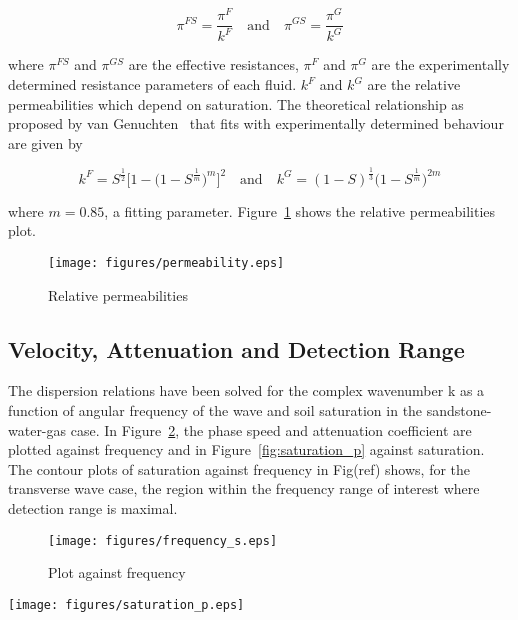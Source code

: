 \documentclass[twocolumn]{article}
\begin{document}
\begin{equation}
    \pi^{FS}= \frac{\pi^F}{k^F}\quad \text{and} \quad \pi^{GS}=\frac{\pi^G}{k^G}
\end{equation}

where $\pi^{FS}$ and $\pi^{GS}$ are the effective resistances, $\pi^F$ and $\pi^G$ are the experimentally determined resistance parameters of each fluid. $k^F$ and $k^G$ are the relative permeabilities which depend on saturation. The theoretical relationship as proposed by van Genuchten~\cite{van_genuchten_1980} that fits with experimentally determined behaviour~\cite{wyckoff_botset_1936} are given by

\begin{equation}
    k^F = S^{\frac{1}{2}}\bigl[1 - \bigl(1-S^{\frac{1}{m}}\bigr)^m\bigr]^2 \quad \text{and} \quad
    k^G = (1-S)^{\frac{1}{3}}\bigl(1 - S^{\frac{1}{m}}\bigr)^{2m}
\end{equation}

where $m = \num{0.85}$, a fitting parameter. Figure~\ref{fig:permeability} shows the relative permeabilities plot.

\begin{figure}
    \centering
    \texttt{[image: figures/permeability.eps]}
    \caption{Relative permeabilities}
    \label{fig:permeability}
\end{figure}

\subsection{Velocity, Attenuation and Detection Range}
The dispersion relations have been solved for the complex wavenumber k as a function of angular frequency of the wave and soil saturation in the sandstone-water-gas case. In Figure~\ref{fig:frequency_s}, the phase speed and attenuation coefficient are plotted against frequency and in Figure~\ref{fig:saturation_p} against saturation. The contour plots of saturation against frequency in Fig(ref) shows, for the transverse wave case, the region within the frequency range of interest where detection range is maximal.

\begin{figure}
    \centering
    \texttt{[image: figures/frequency\_s.eps]}
    \caption{Plot against frequency}
    \label{fig:frequency_s}
\end{figure}

\begin{figure*}[t]
    \centering
    \texttt{[image: figures/saturation\_p.eps]}
    \caption{Plot against saturation}
    \label{fig:saturation_p}
\end{figure*}
\end{document}
